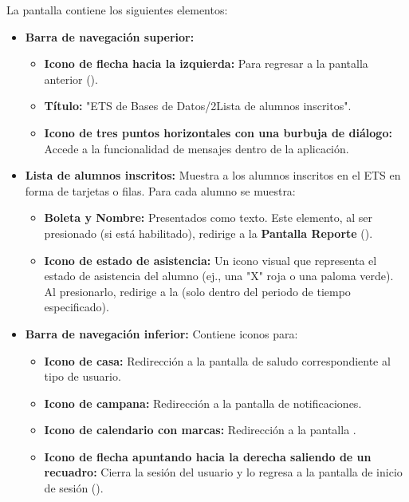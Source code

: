 La pantalla contiene los siguientes elementos:
\begin{itemize}
	\item \textbf{Barra de navegación superior:}
	\begin{itemize}
		\item \textbf{Icono de flecha hacia la izquierda:} Para regresar a la pantalla anterior ().
		\item \textbf{Título:} "ETS de Bases de Datos/2\newline Lista de alumnos inscritos".
		\item \textbf{Icono de tres puntos horizontales con una burbuja de diálogo:} Accede a la funcionalidad de mensajes dentro de la aplicación.
	\end{itemize}
	\item \textbf{Lista de alumnos inscritos:} Muestra a los alumnos inscritos en el ETS en forma de tarjetas o filas. Para cada alumno se muestra:
	\begin{itemize}
		\item \textbf{Boleta y Nombre:} Presentados como texto. Este elemento, al ser presionado (si está habilitado), redirige a la \textbf{Pantalla Reporte} ().
		\item \textbf{Icono de estado de asistencia:} Un icono visual que representa el estado de asistencia del alumno (ej., una "X" roja o una paloma verde). Al presionarlo, redirige a la  (solo dentro del periodo de tiempo especificado).
	\end{itemize}
	\item \textbf{Barra de navegación inferior:} Contiene iconos para:
	\begin{itemize}
		\item \textbf{Icono de casa:} Redirección a la pantalla de saludo correspondiente al tipo de usuario.
		\item \textbf{Icono de campana:} Redirección a la pantalla de notificaciones.
		\item \textbf{Icono de calendario con marcas:} Redirección a la pantalla .
		\item \textbf{Icono de flecha apuntando hacia la derecha saliendo de un recuadro:} Cierra la sesión del usuario y lo regresa a la pantalla de inicio de sesión ().
	\end{itemize}
\end{itemize}

